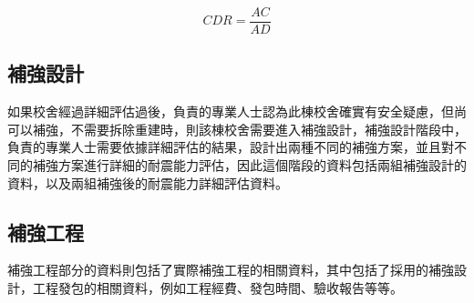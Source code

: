 \begin{equation} CDR = \dfrac{AC}{AD} \label{eq:CDR}\end{equation} 

\subsection{補強設計}

如果校舍經過詳細評估過後，負責的專業人士認為此棟校舍確實有安全疑慮，但尚可以補強，不需要拆除重建時，則該棟校舍需要進入補強設計，補強設計階段中，負責的專業人士需要依據詳細評估的結果，設計出兩種不同的補強方案，並且對不同的補強方案進行詳細的耐震能力評估，因此這個階段的資料包括兩組補強設計的資料，以及兩組補強後的耐震能力詳細評估資料。

\subsection{補強工程}

補強工程部分的資料則包括了實際補強工程的相關資料，其中包括了採用的補強設計，工程發包的相關資料，例如工程經費、發包時間、驗收報告等等。